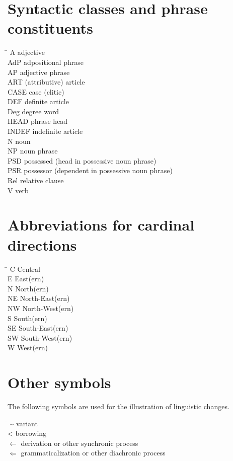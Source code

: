 \section{Syntactic classes and phrase constituents}
\begin{tabbing}
\TABh \= \kill
{A} \> adjective\\
{AdP} \> adpositional phrase\\
{AP} \> adjective phrase\\
{ART} \> (attributive) article\\
{CASE} \> case (clitic)\\
{DEF} \> definite article\\
{Deg} \> degree word\\
{HEAD} \> phrase head\\
{INDEF} \> indefinite article\\
{N} \> noun\\
{NP} \> noun phrase\\
{PSD} \> possessed (head in possessive noun phrase)\\ 
{PSR} \> possessor (dependent in possessive noun phrase)\\
{Rel} \> relative clause\\
{V} \> verb\\
\end{tabbing}

\section{Abbreviations for cardinal directions}
\begin{multicols}{2}
\begin{tabbing}
\TABh \= \kill
{C} \> Central\\
{E} \> East(ern)\\
{N} \> North(ern)\\
{NE} \> North-East(ern)\\
{NW} \> North-West(ern)\\
{S} \> South(ern)\\
{SE} \> South-East(ern)\\
{SW} \> South-West(ern)\\
{W} \> West(ern)\\
\end{tabbing}
\end{multicols}

\section{Other symbols}
The following symbols are used for the illustration of linguistic changes.
\begin{tabbing}
\TABh \= \kill
\textasciitilde \> variant\\
<  \> borrowing\\
$\leftarrow$  \> derivation or other synchronic process\\
$\Leftarrow$  \> grammaticalization or other diachronic process\footnotemark\\
\end{tabbing}

